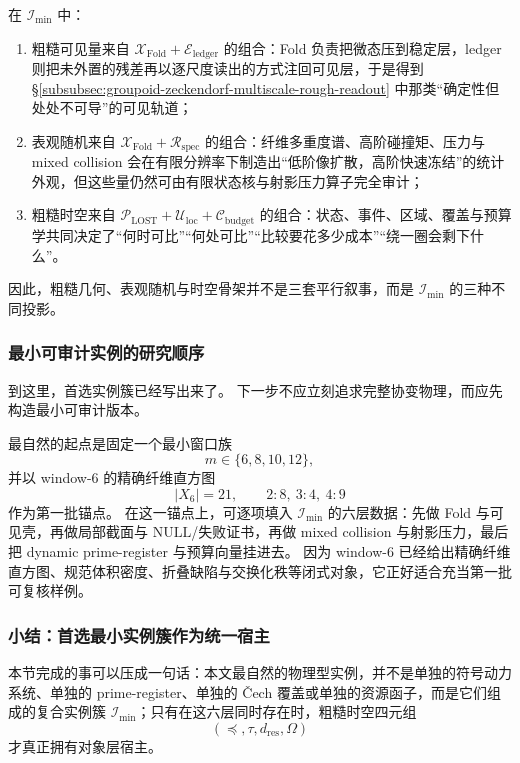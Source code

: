 \begin{remark}\label{rem:typed-address-biaxial-completion-preferred-minimal-instantiation-unified-host}
在 \(\mathcal I_{\min}\) 中：
\begin{enumerate}
  \item 粗糙可见量来自 \(\mathcal X_{\mathrm{Fold}}+\mathcal E_{\mathrm{ledger}}\) 的组合：Fold 负责把微态压到稳定层，ledger 则把未外置的残差再以逐尺度读出的方式注回可见层，于是得到 \S\ref{subsubsec:groupoid-zeckendorf-multiscale-rough-readout} 中那类“确定性但处处不可导”的可见轨道；
  \item 表观随机来自 \(\mathcal X_{\mathrm{Fold}}+\mathcal R_{\mathrm{spec}}\) 的组合：纤维多重度谱、高阶碰撞矩、压力与 mixed collision 会在有限分辨率下制造出“低阶像扩散，高阶快速冻结”的统计外观，但这些量仍然可由有限状态核与射影压力算子完全审计；
  \item 粗糙时空来自 \(\mathcal P_{\mathrm{LOST}}+\mathcal U_{\mathrm{loc}}+\mathcal C_{\mathrm{budget}}\) 的组合：状态、事件、区域、覆盖与预算学共同决定了“何时可比”“何处可比”“比较要花多少成本”“绕一圈会剩下什么”。
\end{enumerate}
因此，粗糙几何、表观随机与时空骨架并不是三套平行叙事，而是 \(\mathcal I_{\min}\) 的三种不同投影。
\end{remark}

\subsubsection{最小可审计实例的研究顺序}\label{subsubsec:typed-address-biaxial-completion-preferred-minimal-instantiation-order}
到这里，首选实例簇已经写出来了。
下一步不应立刻追求完整协变物理，而应先构造最小可审计版本。

\begin{remark}[最小研究顺序]\label{rem:typed-address-biaxial-completion-preferred-minimal-instantiation-order}
最自然的起点是固定一个最小窗口族
\[
m\in\{6,8,10,12\},
\]
并以 window-\(6\) 的精确纤维直方图
\[
|X_6|=21,
\qquad
2:8,\ 3:4,\ 4:9
\]
作为第一批锚点。
在这一锚点上，可逐项填入 \(\mathcal I_{\min}\) 的六层数据：先做 Fold 与可见壳，再做局部截面与 \(\mathrm{NULL}\)/失败证书，再做 mixed collision 与射影压力，最后把 dynamic prime-register 与预算向量挂进去。
因为 window-\(6\) 已经给出精确纤维直方图、规范体积密度、折叠缺陷与交换化秩等闭式对象，它正好适合充当第一批可复核样例。
\end{remark}

\subsubsection{小结：首选最小实例簇作为统一宿主}\label{subsubsec:typed-address-biaxial-completion-preferred-minimal-instantiation-summary}
本节完成的事可以压成一句话：本文最自然的物理型实例，并不是单独的符号动力系统、单独的 prime-register、单独的 Čech 覆盖或单独的资源函子，而是它们组成的复合实例簇 \(\mathcal I_{\min}\)；只有在这六层同时存在时，粗糙时空四元组
\[
(\preceq,\tau,d_{\mathrm{res}},\Omega)
\]
才真正拥有对象层宿主。

